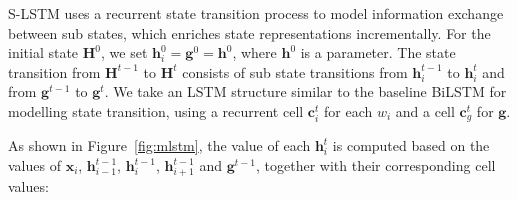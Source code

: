 \documentclass[11pt,a4paper]{article}
\begin{document}
S-LSTM uses a recurrent state transition process to model information exchange between sub states, which enriches state representations incrementally.
For the initial state $\boldsymbol{H}^0$, we set $\boldsymbol{h}_i^0 = \boldsymbol{g}^0 = \boldsymbol{h}^0$, where $\boldsymbol{h}^0$ is a parameter. 
The state transition from $\boldsymbol{H}^{t-1}$ to $\boldsymbol{H}^t$ consists of sub state transitions from $\boldsymbol{h}_i^{t-1}$ to $\boldsymbol{h}_i^t$ and from $\boldsymbol{g}^{t-1}$ to $\boldsymbol{g}^t$.
We take an LSTM structure similar to the baseline BiLSTM for modelling state transition, using a recurrent cell $\boldsymbol{c}_i^t$ for each $w_i$ and a cell $\boldsymbol{c}_g^t$ for $\boldsymbol{g}$.


As shown in Figure~\ref{fig:mlstm}, the value of each $\boldsymbol{h}_i^{t}$ is computed based on the values of $\boldsymbol{x}_i$, $\boldsymbol{h}_{i-1}^{t-1}$, $\boldsymbol{h}_i^{t-1}$, $\boldsymbol{h}_{i+1}^{t-1}$ and $\boldsymbol{g}^{t-1}$, together with their corresponding cell values:
\end{document}
